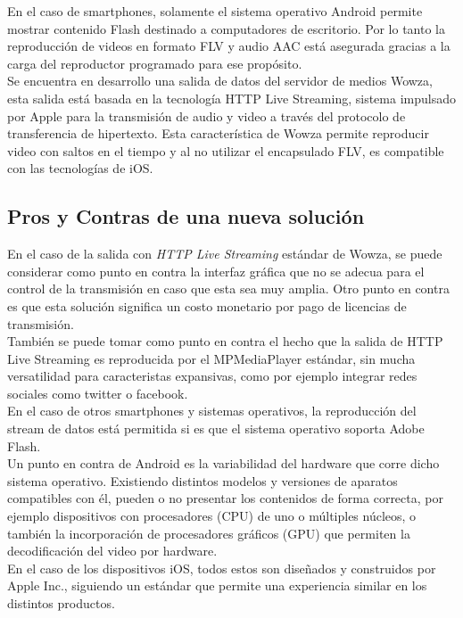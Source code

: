 	En el caso de smartphones, solamente el sistema operativo Android permite mostrar contenido Flash destinado a computadores de escritorio. Por lo tanto la reproducción de videos en formato FLV y audio AAC está asegurada gracias a la carga del reproductor programado para ese propósito.\\

Se encuentra en desarrollo una salida de datos del servidor de medios Wowza, esta salida está basada en la tecnología HTTP Live Streaming, sistema impulsado por Apple para la transmisión de audio y video a través del protocolo de transferencia de hipertexto. Esta característica de Wowza permite reproducir video con  saltos en el tiempo y al no utilizar el encapsulado FLV, es compatible con las tecnologías de iOS.

\subsection{Pros y Contras de una nueva solución}
En el caso de la salida con \textit{HTTP Live Streaming} estándar de Wowza, se puede considerar como punto en contra la interfaz gráfica que no se adecua para el control de la transmisión en caso que esta sea muy amplia. Otro punto en contra es que esta solución significa un costo monetario por pago de licencias de transmisión.\\

	También se puede tomar como punto en contra el hecho que la salida de HTTP Live Streaming es reproducida por el MPMediaPlayer estándar, sin mucha versatilidad para caracteristas expansivas, como por ejemplo integrar redes sociales como twitter o facebook.\\

	En el caso de otros smartphones y sistemas operativos, la reproducción del stream de datos está permitida si es que el sistema operativo soporta Adobe Flash.\\

	Un punto en contra de Android es la variabilidad del hardware que corre dicho sistema operativo. Existiendo distintos modelos y versiones de aparatos compatibles con él, pueden o no presentar los contenidos de forma correcta, por ejemplo dispositivos con procesadores (CPU) de uno o múltiples núcleos, o también la incorporación de procesadores gráficos (GPU) que permiten la decodificación del video por hardware.\\

En el caso de los dispositivos iOS, todos estos son diseñados y construidos por Apple Inc., siguiendo un estándar que permite una experiencia similar en los distintos productos.

